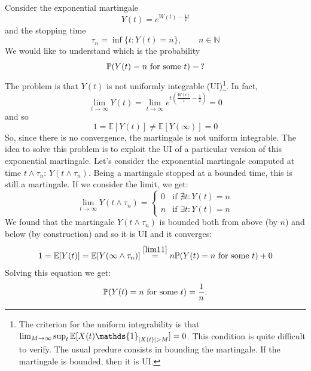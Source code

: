 \begin{example}{}{}{} %
    Consider the exponential martingale
    \begin{equation}
        Y(t)=e^{W(t)-\frac{1}{2}t}
    \end{equation}
    and the stopping time
    \begin{equation}
        \tau_n = \inf\{t:Y(t) = n\}, \qquad n\in\mathbb{N}
    \end{equation}
    We would like to understand which is the probability
    \begin{equation}
        \mathbb{P}(Y(t)=n \text{ for some } t) =\, ?
    \end{equation}
    The problem is that $Y(t)$ is not uniformly integrable (UI)\footnote{The criterion for the uniform integrability is that $\lim_{M\to\infty}\sup_{t}\mathbb{E}[X(t)\mathds{1}_{\abs{X(t)}>M}]=0$. This condition is quite difficult to verify. The usual predure consists in bounding the martingale. If the martingale is bounded, then it is UI.}. In fact,
    \begin{equation*}
        \lim_{t\to\infty}Y(t) = \lim_{t\to\infty}e^{t\left(\frac{W(t)}{t}-\frac{1}{2}\right)} = 0
    \end{equation*}
    and so
    \begin{equation*}
        1 = \mathbb{E}[Y(t)] \ne \mathbb{E}[Y(\infty)] = 0
    \end{equation*}
    So, since there is no convergence, the martingale is not uniform integrable. The idea to solve this problem is to exploit the UI of a particular version of this exponential martingale. Let's consider the exponential martingale computed at time $t\wedge\tau_n$: $Y(t\wedge\tau_n)$. Being a martingale stopped at a bounded time, this is still a martingale. If we consider the limit, we get:
    \begin{equation}\label{lim11}
        \lim_{t\to\infty} Y(t\wedge\tau_n) =
        \begin{cases}
        0 & \text{if } \nexists t : Y(t) = n \\
        n & \text{if } \exists t : Y(t) = n
        \end{cases}
    \end{equation}
    We found that the martingale $Y(t\wedge \tau_n)$ is bounded both from above (by $n$) and below (by construction) and so it is UI and it converges:
    \begin{equation*}
        1 = \mathbb{E}[Y(t)] = \mathbb{E}[Y(\infty\wedge\tau_n)] \overset{\eqref{lim11}}{=} n\mathbb{P}(Y(t)=n \text{ for some } t) + 0
    \end{equation*}
    Solving this equation we get:
    \begin{equation}
        \mathbb{P}(Y(t)=n \text{ for some } t) = \frac{1}{n}.
    \end{equation}
\end{example}
